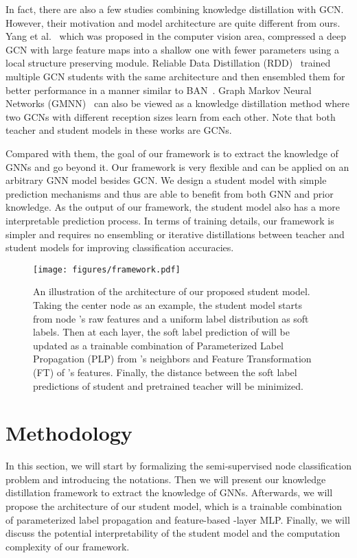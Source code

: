 \documentclass[sigconf]{acmart}
\begin{document}
In fact, there are also a few studies combining knowledge distillation with GCN. However, their motivation and model architecture are quite different from ours. Yang et al.~\cite{yang2020distilling} which was proposed in the computer vision area, compressed a deep GCN with large feature maps into a shallow one with fewer parameters using a local structure preserving module. Reliable Data Distillation (RDD)~\cite{zhang2020reliable} trained multiple GCN students with the same architecture and then ensembled them for better performance in a manner similar to BAN~\cite{furlanello2018born}. Graph Markov Neural Networks (GMNN)~\cite{qu2019gmnn} can also be viewed as a knowledge distillation method where two GCNs with different reception sizes learn from each other. Note that both teacher and student models in these works are GCNs.

Compared with them, the goal of our framework is to extract the knowledge of GNNs and go beyond it. Our framework is very flexible and can be applied on an arbitrary GNN model besides GCN. We design a student model with simple prediction mechanisms and thus are able to benefit from both GNN and prior knowledge. As the output of our framework, the student model also has a more interpretable prediction process. In terms of training details, our framework is simpler and requires no ensembling or iterative distillations between teacher and student models for improving classification accuracies.


\begin{figure*}[t]
    \centering
    \texttt{[image: figures/framework.pdf]}
    \caption{An illustration of the architecture of our proposed student model. Taking the center node  as an example, the student model starts from node 's raw features and a uniform label distribution as soft labels. Then at each layer, the soft label prediction of  will be updated as a trainable combination of Parameterized Label Propagation (PLP) from 's neighbors and Feature Transformation (FT) of 's features. Finally, the distance between the soft label predictions of student and pretrained teacher will be minimized.}
    \label{fig:model}
\end{figure*}

\section{Methodology}
In this section, we will start by formalizing the semi-supervised node classification problem and introducing the notations. Then we will present our knowledge distillation framework to extract the knowledge of GNNs. Afterwards, we will propose the architecture of our student model, which is a trainable combination of parameterized label propagation and feature-based -layer MLP. Finally, we will discuss the potential interpretability of the student model and the computation complexity of our framework.
\end{document}
